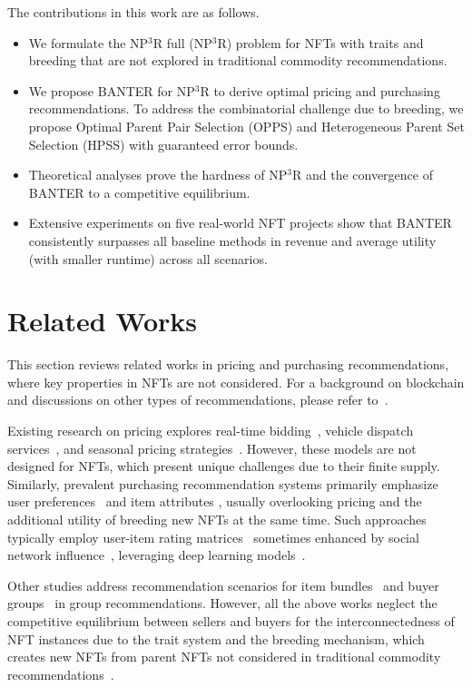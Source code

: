 \documentclass[conference]{IEEEtran}
\theoremstyle{plain}
\begin{document}
    The contributions in this work are as follows.
    \begin{itemize}
        \item 
        We formulate the NP$^3$R full (NP$^3$R) problem for NFTs with traits and breeding that are not explored in traditional commodity recommendations.
        \item 
        We propose BANTER for NP$^3$R to derive optimal pricing and purchasing recommendations. To address the combinatorial challenge due to breeding, we propose Optimal Parent Pair Selection (OPPS) and Heterogeneous Parent Set Selection (HPSS) with guaranteed error bounds.
        \item 
        Theoretical analyses prove the hardness of NP$^3$R and the convergence of BANTER to a competitive equilibrium.
        \item 
        Extensive experiments on five real-world NFT projects show that BANTER consistently surpasses all baseline methods in revenue and average utility (with smaller runtime) across all scenarios. 
    \end{itemize}

\section{Related Works}
This section reviews related works in pricing and purchasing recommendations, where key properties in NFTs are not considered. For a background on blockchain and discussions on other types of recommendations, please refer to~\cite{supplementary}.

Existing research on pricing explores real-time bidding~\cite{ren2019deep, yang2021multi}, vehicle dispatch services~\cite{zheng2019auction, zhang2022multi}, and seasonal pricing strategies~\cite{zhu2022modeling}. However, these models are not designed for NFTs, which present unique challenges due to their finite supply. Similarly, prevalent purchasing recommendation systems primarily emphasize user preferences~\cite{chen2019personalized} and item attributes \cite{zhang2019deep}, usually overlooking pricing and the additional utility of breeding new NFTs at the same time. Such approaches typically employ user-item rating matrices~\cite{koren2009matrix, he2020lightgcn} sometimes enhanced by social network influence~\cite{zhou2017enhancing, zhou2019real, yang2021consisrec}, leveraging deep learning models~\cite{he2020lightgcn, yang2021consisrec}. 

Other studies address recommendation scenarios for item bundles~\cite{zhu2014bundle, chang2020bundle} and buyer groups~\cite{cao2018attentive, zhang2017item, xiao2017fairness} in group recommendations. However, all the above works neglect the competitive equilibrium between sellers and buyers for the interconnectedness of NFT instances due to the trait system and the breeding mechanism, which creates new NFTs from parent NFTs not considered in traditional commodity recommendations~\cite{he2020lightgcn, yang2021consisrec, chang2020bundle, cao2018attentive}. 
\end{document}
